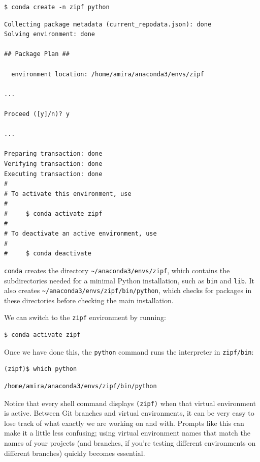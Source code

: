 \documentclass[
]{krantz}
\begin{document}
\begin{verbatim}
$ conda create -n zipf python
\end{verbatim}

\begin{verbatim}
Collecting package metadata (current_repodata.json): done
Solving environment: done

## Package Plan ##

  environment location: /home/amira/anaconda3/envs/zipf

...

Proceed ([y]/n)? y

...

Preparing transaction: done
Verifying transaction: done
Executing transaction: done
#
# To activate this environment, use
#
#     $ conda activate zipf
#
# To deactivate an active environment, use
#
#     $ conda deactivate
\end{verbatim}

\texttt{conda} creates the directory \texttt{\textasciitilde{}/anaconda3/envs/zipf},
which contains the subdirectories needed for a minimal Python installation,
such as \texttt{bin} and \texttt{lib}.
It also creates \texttt{\textasciitilde{}/anaconda3/envs/zipf/bin/python},
which checks for packages in these directories before checking the main installation.

We can switch to the \texttt{zipf} environment by running:

\begin{verbatim}
$ conda activate zipf
\end{verbatim}

Once we have done this,
the \texttt{python} command runs the interpreter in \texttt{zipf/bin}:

\begin{verbatim}
(zipf)$ which python
\end{verbatim}

\begin{verbatim}
/home/amira/anaconda3/envs/zipf/bin/python
\end{verbatim}

Notice that every shell command displays \texttt{(zipf)} when that virtual environment is active.
Between Git branches and virtual environments,
it can be very easy to lose track of what exactly we are working on and with.
Prompts like this can make it a little less confusing;
using virtual environment names that match the names of your projects
(and branches, if you're testing different environments on different branches)
quickly becomes essential.
\end{document}
